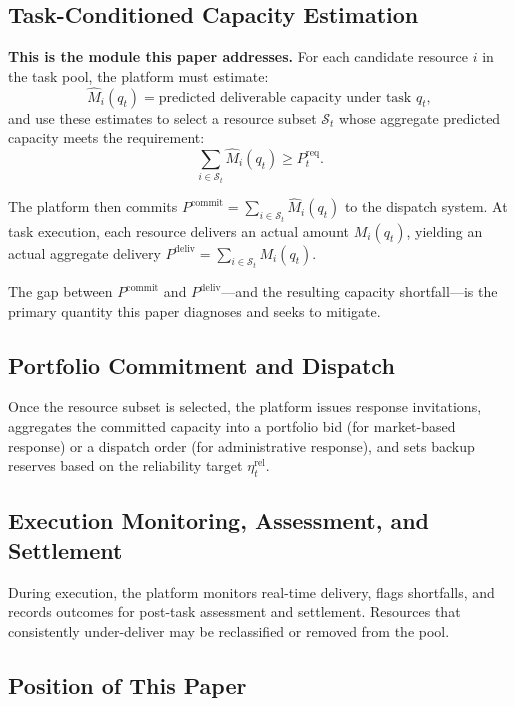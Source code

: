 \documentclass[utf8]{FrontiersinHarvard}
\newcommand{\Mhat}{\widehat{M}}
\newcommand{\Preq}{P^{\mathrm{req}}}
\newcommand{\Pcommit}{P^{\mathrm{commit}}}
\newcommand{\Pdeliv}{P^{\mathrm{deliv}}}
\begin{document}
\subsection{Task-Conditioned Capacity Estimation}
\label{subsec:capacity_estimation}

\textbf{This is the module this paper addresses.} For each
candidate resource $i$ in the task pool, the platform must
estimate:
\begin{equation}
    \Mhat_i(q_t) = \text{predicted deliverable capacity under
    task~} q_t,
\end{equation}
and use these estimates to select a resource subset
$\mathcal{S}_t$ whose aggregate predicted capacity meets the
requirement:
\begin{equation}
    \sum_{i \in \mathcal{S}_t} \Mhat_i(q_t) \geq \Preq_t.
\end{equation}

The platform then commits
$\Pcommit = \sum_{i \in \mathcal{S}_t} \Mhat_i(q_t)$ to the
dispatch system. At task execution, each resource delivers an
actual amount $M_i(q_t)$, yielding an actual aggregate delivery
$\Pdeliv = \sum_{i \in \mathcal{S}_t} M_i(q_t)$.

The gap between $\Pcommit$ and $\Pdeliv$---and the resulting
capacity shortfall---is the primary quantity this paper
diagnoses and seeks to mitigate.

\subsection{Portfolio Commitment and Dispatch}

Once the resource subset is selected, the platform issues
response invitations, aggregates the committed capacity into a
portfolio bid (for market-based response) or a dispatch order
(for administrative response), and sets backup reserves based
on the reliability target $\eta_t^{\mathrm{rel}}$.

\subsection{Execution Monitoring, Assessment, and Settlement}

During execution, the platform monitors real-time delivery,
flags shortfalls, and records outcomes for post-task assessment
and settlement. Resources that consistently under-deliver may be
reclassified or removed from the pool.

\subsection{Position of This Paper}
\end{document}
